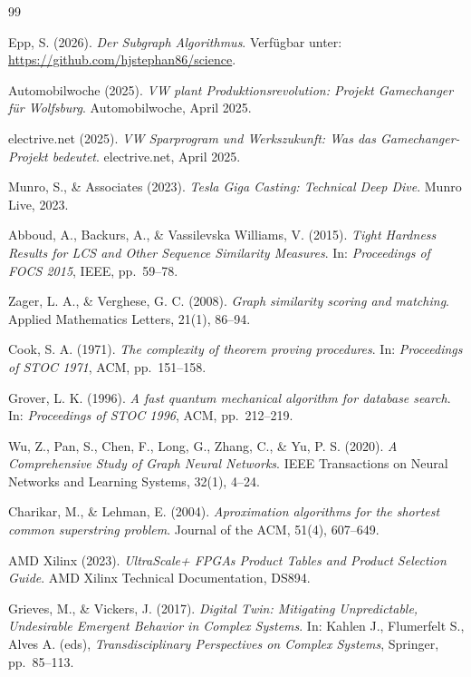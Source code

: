 ﻿\documentclass[a4paper,12pt]{article}
\theoremstyle{definition}
\begin{document}
\begin{thebibliography}{99}

Epp, S. (2026).
\textit{Der Subgraph Algorithmus}.
Verfügbar unter: \url{https://github.com/hjstephan86/science}.

Automobilwoche (2025).
\textit{VW plant Produktionsrevolution: Projekt Gamechanger für Wolfsburg}.
Automobilwoche, April 2025.

electrive.net (2025).
\textit{VW Sparprogram und Werkszukunft: Was das Gamechanger-Projekt bedeutet}.
electrive.net, April 2025.

Munro, S., \& Associates (2023).
\textit{Tesla Giga Casting: Technical Deep Dive}.
Munro Live, 2023.

Abboud, A., Backurs, A., \& Vassilevska Williams, V. (2015).
\textit{Tight Hardness Results for LCS and Other Sequence Similarity Measures}.
In: \textit{Proceedings of FOCS 2015}, IEEE, pp.~59--78.

Zager, L. A., \& Verghese, G. C. (2008).
\textit{Graph similarity scoring and matching}.
Applied Mathematics Letters, 21(1), 86--94.

Cook, S. A. (1971).
\textit{The complexity of theorem proving procedures}.
In: \textit{Proceedings of STOC 1971}, ACM, pp.~151--158.

Grover, L. K. (1996).
\textit{A fast quantum mechanical algorithm for database search}.
In: \textit{Proceedings of STOC 1996}, ACM, pp.~212--219.

Wu, Z., Pan, S., Chen, F., Long, G., Zhang, C., \& Yu, P. S. (2020).
\textit{A Comprehensive Study of Graph Neural Networks}.
IEEE Transactions on Neural Networks and Learning Systems, 32(1), 4--24.

Charikar, M., \& Lehman, E. (2004).
\textit{Aproximation algorithms for the shortest common superstring problem}.
Journal of the ACM, 51(4), 607--649.

AMD Xilinx (2023).
\textit{UltraScale+ FPGAs Product Tables and Product Selection Guide}.
AMD Xilinx Technical Documentation, DS894.

Grieves, M., \& Vickers, J. (2017).
\textit{Digital Twin: Mitigating Unpredictable, Undesirable Emergent Behavior in Complex Systems}.
In: Kahlen J., Flumerfelt S., Alves A. (eds), \textit{Transdisciplinary Perspectives on Complex Systems},
Springer, pp.~85--113.


\end{thebibliography}
\end{document}
